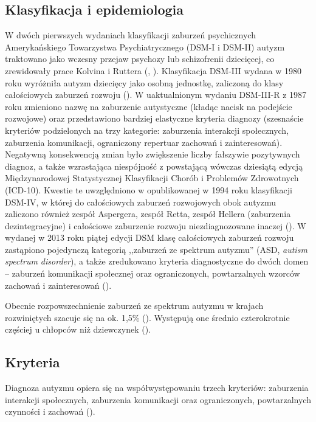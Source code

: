     \subsection{Klasyfikacja i epidemiologia}
    W dwóch pierwszych wydaniach klasyfikacji zaburzeń psychicznych Amerykańskiego Towarzystwa Psychiatrycznego (DSM-I i DSM-II) autyzm traktowano jako wczesny przejaw psychozy lub schizofrenii dziecięcej, co zrewidowały prace Kolvina i Ruttera (\cite{kolvin1972infantile}, \cite{rutter1972childhood}).
    Klasyfikacja DSM-III wydana w 1980 roku wyróżniła autyzm dziecięcy jako osobną jednostkę, zaliczoną do klasy całościowych zaburzeń rozwoju (\cite{volkmar2014kanner}).
    W uaktualnionym wydaniu DSM-III-R z 1987 roku zmieniono nazwę na zaburzenie autystyczne (kładąc nacisk na podejście rozwojowe) oraz przedstawiono bardziej elastyczne kryteria diagnozy (szesnaście kryteriów podzielonych na trzy kategorie: zaburzenia interakcji społecznych, zaburzenia komunikacji, ograniczony repertuar zachowań i zainteresowań).
    Negatywną konsekwencją zmian było zwiększenie liczby fałszywie pozytywnych diagnoz, a także wzrastająca niespójność z powstającą wówczas dziesiątą edycją Międzynarodowej Statystycznej Klasyfikacji Chorób i Problemów Zdrowotnych (ICD-10).
    Kwestie te uwzględniono w opublikowanej w 1994 roku klasyfikacji DSM-IV, w której do całościowych zaburzeń rozwojowych obok autyzmu zaliczono również zespół Aspergera, zespół Retta, zespół Hellera (zaburzenia dezintegracyjne) i całościowe zaburzenie rozwoju niezdiagnozowane inaczej (\cite{volkmar2014kanner}).
    W wydanej w 2013 roku piątej edycji DSM klasę całościowych zaburzeń rozwoju zastąpiono pojedynczą kategorią ,,zaburzeń ze spektrum autyzmu'' (ASD, \emph{autism spectrum disorder}), a także zredukowano kryteria diagnostyczne do dwóch domen -- zaburzeń komunikacji społecznej oraz ograniczonych, powtarzalnych wzorców zachowań i zainteresowań (\cite{maenner2014potential}).
    
    Obecnie rozpowszechnienie zaburzeń ze spektrum autyzmu w krajach rozwiniętych szacuje się na ok. 1,5\%  (\cite{lyall2017changing}).
    Występują one średnio czterokrotnie częściej u chłopców niż dziewczynek (\cite{lyall2017changing}).
    
    \subsection{Kryteria}
    Diagnoza autyzmu opiera się na współwystępowaniu trzech kryteriów: zaburzenia interakcji społecznych, zaburzenia komunikacji oraz ograniczonych, powtarzalnych czynności i zachowań (\cite{frith2008autyzm}).
    
